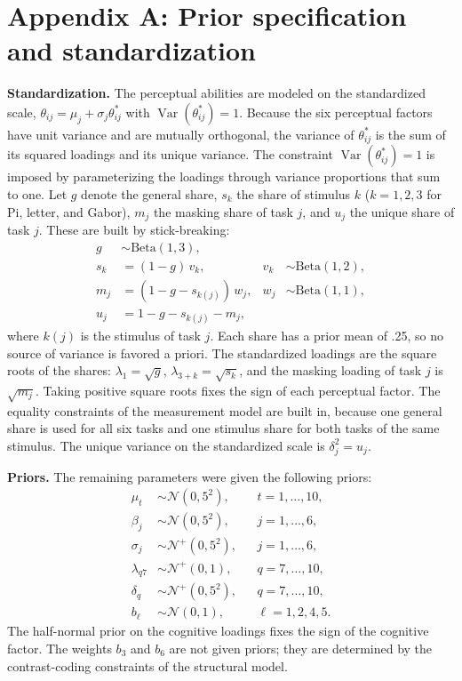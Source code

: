 \documentclass[
  ,man]{apa6}
\begin{document}
\newpage

\section{Appendix A: Prior specification and standardization}\label{appendix-a-prior-specification-and-standardization}

\textbf{Standardization.} The perceptual abilities are modeled on the standardized scale, \(\theta_{ij} = \mu_j + \sigma_j\theta^*_{ij}\) with \(\operatorname{Var}(\theta^*_{ij}) = 1\). Because the six perceptual factors have unit variance and are mutually orthogonal, the variance of \(\theta^*_{ij}\) is the sum of its squared loadings and its unique variance. The constraint \(\operatorname{Var}(\theta^*_{ij}) = 1\) is imposed by parameterizing the loadings through variance proportions that sum to one. Let \(g\) denote the general share, \(s_k\) the share of stimulus \(k\) (\(k = 1, 2, 3\) for Pi, letter, and Gabor), \(m_j\) the masking share of task \(j\), and \(u_j\) the unique share of task \(j\). These are built by stick-breaking:
\[
\begin{aligned}
g &\sim \text{Beta}(1, 3), \\
s_k &= (1 - g)\,v_k, & v_k &\sim \text{Beta}(1, 2), \\
m_j &= (1 - g - s_{k(j)})\,w_j, & w_j &\sim \text{Beta}(1, 1), \\
u_j &= 1 - g - s_{k(j)} - m_j,
\end{aligned}
\]
where \(k(j)\) is the stimulus of task \(j\). Each share has a prior mean of .25, so no source of variance is favored a priori. The standardized loadings are the square roots of the shares: \(\lambda_1 = \sqrt{g}\), \(\lambda_{3+k} = \sqrt{s_k}\), and the masking loading of task \(j\) is \(\sqrt{m_j}\). Taking positive square roots fixes the sign of each perceptual factor. The equality constraints of the measurement model are built in, because one general share is used for all six tasks and one stimulus share for both tasks of the same stimulus. The unique variance on the standardized scale is \(\delta_j^2 = u_j\).

\textbf{Priors.} The remaining parameters were given the following priors:
\[
\begin{aligned}
\mu_t &\sim \mathcal{N}(0, 5^2), && t = 1, \ldots, 10, \\
\beta_j &\sim \mathcal{N}(0, 5^2), && j = 1, \ldots, 6, \\
\sigma_j &\sim \mathcal{N}^{+}(0, 5^2), && j = 1, \ldots, 6, \\
\lambda_{q7} &\sim \mathcal{N}^{+}(0, 1), && q = 7, \ldots, 10, \\
\delta_q &\sim \mathcal{N}^{+}(0, 5^2), && q = 7, \ldots, 10, \\
b_\ell &\sim \mathcal{N}(0, 1), && \ell = 1, 2, 4, 5.
\end{aligned}
\]
The half-normal prior on the cognitive loadings fixes the sign of the cognitive factor. The weights \(b_3\) and \(b_6\) are not given priors; they are determined by the contrast-coding constraints of the structural model.
\end{document}

